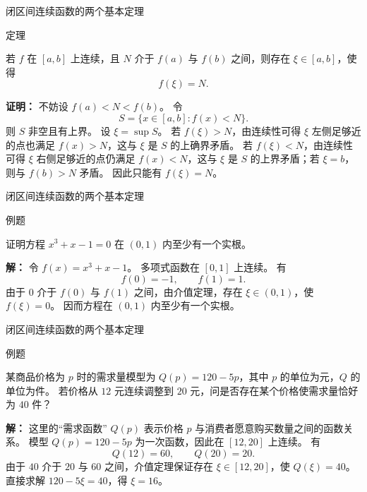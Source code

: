 \documentclass[aspectratio=169,10pt,fontset=fandol]{ctexbeamer}
\begin{document}
\begin{frame}[t,fragile]{闭区间连续函数的两个基本定理}
\normalsize
\begin{block}{定理}
{\normalsize

若 $f$ 在 $[a,b]$ 上连续，且 $N$ 介于 $f(a)$ 与 $f(b)$ 之间，则存在 $\xi\in[a,b]$，使得
\[
f(\xi)=N.
\]

}
\end{block}
\pause
{\normalsize
\textbf{证明：}
不妨设 $f(a)<N<f(b)$。 令
\[
S=\{x\in[a,b]:f(x)<N\}.
\]
则 $S$ 非空且有上界。 设 $\xi=\sup S$。 若 $f(\xi)>N$，由连续性可得 $\xi$ 左侧足够近的点也满足 $f(x)>N$，这与 $\xi$ 是 $S$ 的上确界矛盾。 若 $f(\xi)<N$，由连续性可得 $\xi$ 右侧足够近的点仍满足 $f(x)<N$，这与 $\xi$ 是 $S$ 的上界矛盾；若 $\xi=b$，则与 $f(b)>N$ 矛盾。 因此只能有 $f(\xi)=N$。

}
\end{frame}
\begin{frame}[t,fragile]{闭区间连续函数的两个基本定理}
\normalsize
\begin{block}{例题}
{\normalsize
证明方程 $x^3+x-1=0$ 在 $(0,1)$ 内至少有一个实根。

}
\end{block}
\pause
{\normalsize
\textbf{解：}
令 $f(x)=x^3+x-1$。 多项式函数在 $[0,1]$ 上连续。 有
\[
f(0)=-1,\qquad f(1)=1.
\]
由于 $0$ 介于 $f(0)$ 与 $f(1)$ 之间，由介值定理，存在 $\xi\in(0,1)$，使 $f(\xi)=0$。 因而方程在 $(0,1)$ 内至少有一个实根。

}
\end{frame}
\begin{frame}[t,fragile]{闭区间连续函数的两个基本定理}
\normalsize
\begin{block}{例题}
{\normalsize
某商品价格为 $p$ 时的需求量模型为 $Q(p)=120-5p$，其中 $p$ 的单位为元，$Q$ 的单位为件。 若价格从 $12$ 元连续调整到 $20$ 元，问是否存在某个价格使需求量恰好为 $40$ 件？

}
\end{block}
\pause
{\normalsize
\textbf{解：}
这里的“需求函数” $Q(p)$ 表示价格 $p$ 与消费者愿意购买数量之间的函数关系。 模型 $Q(p)=120-5p$ 为一次函数，因此在 $[12,20]$ 上连续。 有
\[
Q(12)=60,\qquad Q(20)=20.
\]
由于 $40$ 介于 $20$ 与 $60$ 之间，介值定理保证存在 $\xi\in[12,20]$，使 $Q(\xi)=40$。 直接求解 $120-5\xi=40$，得 $\xi=16$。

}
\end{frame}
\end{document}
